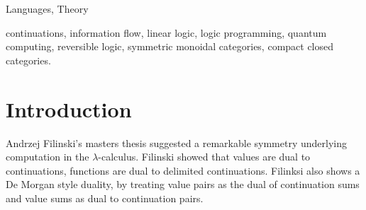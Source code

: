 \documentclass[preprint]{sigplanconf}
\newcommand{\lcal}{\ensuremath{\lambda}-calculus\xspace}
\begin{document}
\begin{abstract}
\end{abstract}




\terms
Languages, Theory

\keywords continuations, information flow, linear logic, logic programming,
quantum computing, reversible logic, symmetric monoidal categories, compact
closed categories.

\section{Introduction}

Andrzej Filinski's masters thesis
\cite{Filinski:1989:DCI:648332.755574} suggested a remarkable symmetry
underlying computation in the \lcal. Filinski showed that values are
dual to continuations, functions are dual to delimited
continuations. Filinksi also shows a De Morgan style duality, by
treating value pairs as the dual of continuation sums and value sums
as dual to continuation pairs.
\end{document}
